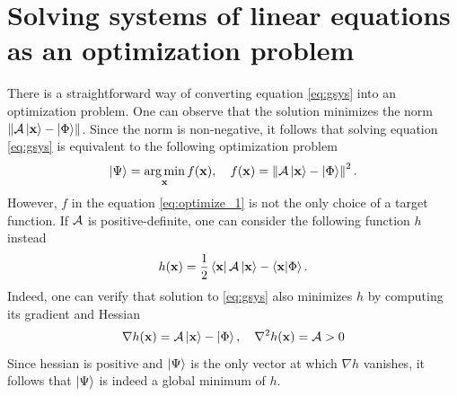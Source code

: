 \section{Solving systems of linear equations as an optimization problem}
There is a straightforward way of converting equation \eqref{eq:gsys} into an
optimization problem. One can observe that the solution minimizes the norm
$\left\Vert \mathcal{A}\ket{\mathbf{x}} - \ket{\Phi}\right\Vert$. Since the
norm is non-negative, it follows that solving equation \eqref{eq:gsys} is
equivalent to the following optimization problem
\begin{equation}
  \label{eq:optimize_1}
  \ket{\Psi} = \operatorname*{arg\,min}_{\mathbf{x}} f(\mathbf{x}), \quad f({\mathbf x}) = \left\Vert \mathcal{A}\ket{\mathbf{x}} - \ket{\Phi}\right\Vert^2.
\end{equation}
However, $f$ in the equation \eqref{eq:optimize_1} is not the only choice of a
target function. If $\mathcal{A}$ is positive-definite, one can consider the
following function $h$ instead
\begin{equation}
  \label{eq:optimize_2}
  h(\mathbf{x})=\frac{1}{2}\bra{\mathbf{x}}\mathcal{A}\ket{\mathbf{x}} -
  \braket{\mathbf{x}}{\Phi}.
\end{equation}
Indeed, one can verify that solution to \eqref{eq:gsys} also minimizes $h$ by
computing its gradient and Hessian
\begin{equation}
  \nabla h(\mathbf{x}) = \mathcal{A}\ket{\mathbf{x}}-\ket{\Phi}, \quad \nabla^2 h({\mathbf
    x})=\mathcal{A}>0
\end{equation}
Since hessian is positive and $\ket{\Psi}$ is the only vector at which $\nabla
  h$ vanishes, it follows that $\ket{\Psi}$ is indeed a global minimum of $h$.

